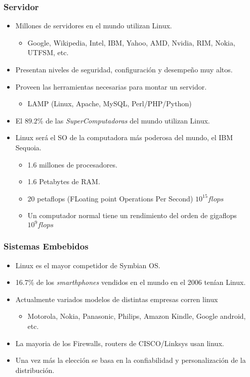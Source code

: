 \frame
{
\frametitle{Servidor}
\begin{itemize}
	\item Millones de servidores en el mundo utilizan Linux.
	\begin{itemize}
		\item Google, Wikipedia, Intel, IBM, Yahoo, AMD, Nvidia, RIM, Nokia, UTFSM, etc.
	\end{itemize}
	\item Presentan niveles de seguridad, configuración y desempeño muy altos.
	\item Proveen las herramientas necesarias para montar un servidor.
	\begin{itemize}
		\item LAMP (Linux, Apache, MySQL, Perl/PHP/Python)
	\end{itemize}
	\item El $89.2\%$ de las \emph{SuperComputadoras} del mundo utilizan Linux.
	\item Linux será el SO de la computadora más poderosa del mundo, el IBM Sequoia.
	\begin{itemize}
		\item 1.6 millones de procesadores.
		\item 1.6 Petabytes de RAM.
		\item 20 petaflops (FLoating point Operations Per Second) $10^{15} flops$
		\item Un computador normal tiene un rendimiento del orden de gigaflops $10^{9} flops$
	\end{itemize}
\end{itemize}
}

\frame
{
\frametitle{Sistemas Embebidos}
\begin{itemize}
	\item Linux es el mayor competidor de Symbian OS.
	\item 16.7\% de los \emph{smarthphones} vendidos en el mundo en el 2006 tenían Linux.
	\item Actualmente variados modelos de distintas empresas corren linux
	\begin{itemize}
		\item Motorola, Nokia, Panasonic, Philips, Amazon Kindle, Google android, etc.
	\end{itemize}
	\item La mayoria de los Firewalls, routers de CISCO/Linksys usan linux.
	\item Una vez más la elección se basa en la confiabilidad y personalización de la distribución.
\end{itemize}
}
